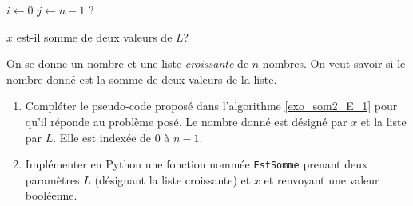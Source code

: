 \begin{algorithm}
  $i\leftarrow 0$\;
  $j\leftarrow n-1$\;
   ?\;
  \caption{$x$ est-il somme de deux valeurs de $L$?}
  \label{exo_som2_E_1}
\end{algorithm}

On se donne un nombre et une liste \emph{croissante} de $n$ nombres. On veut savoir si le nombre donné est la somme de deux valeurs de la liste.
\begin{enumerate}
  \item Compléter le pseudo-code proposé dans l'algorithme \ref{exo_som2_E_1} pour qu'il réponde au problème posé. Le nombre donné est désigné par $x$ et la liste par $L$. Elle est indexée de $0$ à $n-1$.
  \item Implémenter en Python une fonction nommée \verb|EstSomme| prenant deux paramètres $L$ (désignant la liste croissante) et $x$ et renvoyant une valeur booléenne.  
\end{enumerate}


